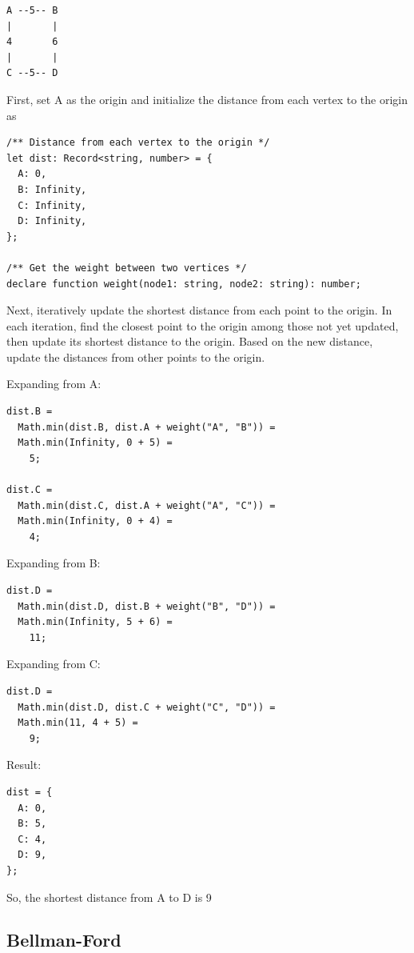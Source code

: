 \documentclass[11pt,journal,compsoc]{IEEEtran}
\begin{document}
\begin{verbatim}
A --5-- B
|       |
4       6
|       |
C --5-- D
\end{verbatim}

First, set A as the origin and initialize the distance from each vertex to the origin as \infty

\begin{verbatim}
/** Distance from each vertex to the origin */
let dist: Record<string, number> = {
  A: 0,
  B: Infinity,
  C: Infinity,
  D: Infinity,
};

/** Get the weight between two vertices */
declare function weight(node1: string, node2: string): number;
\end{verbatim}

Next, iteratively update the shortest distance from each point to the origin. In each iteration, find the closest point to the origin among those not yet updated, then update its shortest distance to the origin. Based on the new distance, update the distances from other points to the origin.

Expanding from A:

\begin{verbatim}
dist.B =
  Math.min(dist.B, dist.A + weight("A", "B")) =
  Math.min(Infinity, 0 + 5) =
    5;

dist.C =
  Math.min(dist.C, dist.A + weight("A", "C")) =
  Math.min(Infinity, 0 + 4) =
    4;
\end{verbatim}

Expanding from B:

\begin{verbatim}
dist.D =
  Math.min(dist.D, dist.B + weight("B", "D")) =
  Math.min(Infinity, 5 + 6) =
    11;
\end{verbatim}

Expanding from C:

\begin{verbatim}
dist.D = 
  Math.min(dist.D, dist.C + weight("C", "D")) = 
  Math.min(11, 4 + 5) = 
    9;
\end{verbatim}

Result:

\begin{verbatim}
dist = {
  A: 0,
  B: 5,
  C: 4,
  D: 9,
};
\end{verbatim}

So, the shortest distance from A to D is 9


\subsection{Bellman-Ford}
\end{document}
